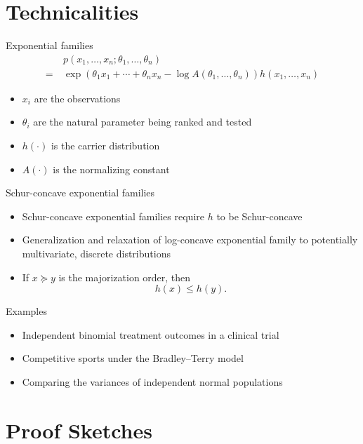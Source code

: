 \documentclass{beamer}
\begin{document}
\section{Technicalities}

\begin{frame}{Exponential families}
\begin{align*}
&~ p(x_1, \ldots, x_n; \theta_1, \ldots, \theta_n) \\
= &~ \exp(\theta_1 x_1 + \cdots + \theta_n x_n - \log A(\theta_1, \ldots, \theta_n)) h(x_1, \ldots, x_n)
\end{align*}
\begin{itemize}
\item $x_i$ are the observations
\item $\theta_i$ are the natural parameter being ranked and tested
\item $h(\cdot)$ is the carrier distribution
\item $A(\cdot)$ is the normalizing constant
\end{itemize}
\end{frame}

\begin{frame}{Schur-concave exponential families}
\begin{itemize}
\item Schur-concave exponential families require $h$ to be Schur-concave
\item Generalization and relaxation of log-concave exponential family to potentially multivariate, discrete distributions
\item If $x \succeq y$ is the majorization order, then
\[
h(x) \le h(y).
\]
\end{itemize}
\end{frame}

\begin{frame}{Examples}
\begin{itemize}
\item Independent binomial treatment outcomes in a clinical trial
\item Competitive sports under the Bradley--Terry model
\item Comparing the variances of independent normal populations
\end{itemize}
\end{frame}

\section{Proof Sketches}
\end{document}
